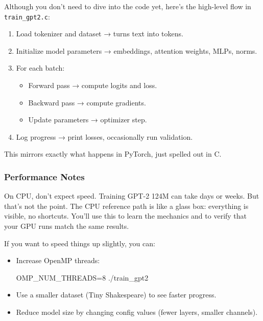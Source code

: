 \documentclass[
  letterpaper,
  DIV=11,
  numbers=noendperiod]{scrreprt}
\newenvironment{Shaded}{\begin{snugshade}}{\end{snugshade}}
\newcommand{\ExtensionTok}[1]{\textcolor[rgb]{0.00,0.23,0.31}{#1}}
\newcommand{\NormalTok}[1]{\textcolor[rgb]{0.00,0.23,0.31}{#1}}
\newcommand{\OperatorTok}[1]{\textcolor[rgb]{0.37,0.37,0.37}{#1}}
\newcommand{\VariableTok}[1]{\textcolor[rgb]{0.07,0.07,0.07}{#1}}
\providecommand{\tightlist}{%
  \setlength{\itemsep}{0pt}\setlength{\parskip}{0pt}}
\begin{document}
Although you don't need to dive into the code yet, here's the high-level
flow in \texttt{train\_gpt2.c}:

\begin{enumerate}
\def\labelenumi{\arabic{enumi}.}
\item
  Load tokenizer and dataset → turns text into tokens.
\item
  Initialize model parameters → embeddings, attention weights, MLPs,
  norms.
\item
  For each batch:

  \begin{itemize}
  \tightlist
  \item
    Forward pass → compute logits and loss.
  \item
    Backward pass → compute gradients.
  \item
    Update parameters → optimizer step.
  \end{itemize}
\item
  Log progress → print losses, occasionally run validation.
\end{enumerate}

This mirrors exactly what happens in PyTorch, just spelled out in C.

\subsubsection{Performance Notes}\label{performance-notes}

On CPU, don't expect speed. Training GPT-2 124M can take days or weeks.
But that's not the point. The CPU reference path is like a glass box:
everything is visible, no shortcuts. You'll use this to learn the
mechanics and to verify that your GPU runs match the same results.

If you want to speed things up slightly, you can:

\begin{itemize}
\item
  Increase OpenMP threads:

\begin{Shaded}
\begin{Highlighting}[]
\VariableTok{OMP\_NUM\_THREADS}\OperatorTok{=}\NormalTok{8 }\ExtensionTok{./train\_gpt2}
\end{Highlighting}
\end{Shaded}
\item
  Use a smaller dataset (Tiny Shakespeare) to see faster progress.
\item
  Reduce model size by changing config values (fewer layers, smaller
  channels).
\end{itemize}
\end{document}
